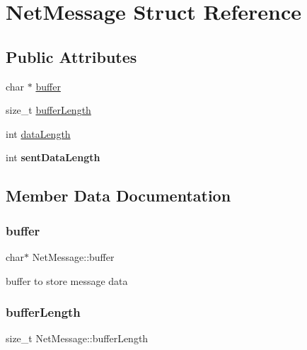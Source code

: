 \hypertarget{struct_net_message}{}\section{Net\+Message Struct Reference}
\label{struct_net_message}
\subsection*{Public Attributes}
\begin{DoxyCompactItemize}
\item 
char $\ast$ \hyperlink{struct_net_message_afc4f20d5b94c8626893472209f811bed}{buffer}
\item 
size\+\_\+t \hyperlink{struct_net_message_a2858124b6f87a1e2baaed00fc0d15c9a}{buffer\+Length}
\item 
int \hyperlink{struct_net_message_a17945ca7672211a8721beb04afa1871e}{data\+Length}
\item 
\mbox{\label{struct_net_message_a6c7c3baa2681ee9ffc84b1fdad8e53b5}} 
int {\bfseries sent\+Data\+Length}
\end{DoxyCompactItemize}


\subsection{Member Data Documentation}
\mbox{\label{struct_net_message_afc4f20d5b94c8626893472209f811bed}} 
\subsubsection{\texorpdfstring{buffer}{buffer}}
{\footnotesize\ttfamily char$\ast$ Net\+Message\+::buffer}

buffer to store message data \mbox{\label{struct_net_message_a2858124b6f87a1e2baaed00fc0d15c9a}} 
\subsubsection{\texorpdfstring{buffer\+Length}{bufferLength}}
{\footnotesize\ttfamily size\+\_\+t Net\+Message\+::buffer\+Length}


